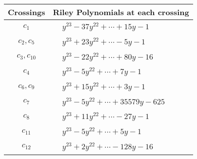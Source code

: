\documentclass[1p]{elsarticle_modified}
\theoremstyle{definition}
\begin{document}
\begin{tabular}{m{50pt}|m{274pt}}
Crossings & \hspace{64pt}Riley Polynomials at each crossing \\
\hline $$\begin{aligned}c_{1}\end{aligned}$$&$\begin{aligned}
&y^{23}-37 y^{22}+\cdots+15 y-1
\end{aligned}$\\
\hline $$\begin{aligned}c_{2},c_{5}\end{aligned}$$&$\begin{aligned}
&y^{23}+23 y^{22}+\cdots-5 y-1
\end{aligned}$\\
\hline $$\begin{aligned}c_{3},c_{10}\end{aligned}$$&$\begin{aligned}
&y^{23}-22 y^{22}+\cdots+80 y-16
\end{aligned}$\\
\hline $$\begin{aligned}c_{4}\end{aligned}$$&$\begin{aligned}
&y^{23}-5 y^{22}+\cdots+7 y-1
\end{aligned}$\\
\hline $$\begin{aligned}c_{6},c_{9}\end{aligned}$$&$\begin{aligned}
&y^{23}+15 y^{22}+\cdots+3 y-1
\end{aligned}$\\
\hline $$\begin{aligned}c_{7}\end{aligned}$$&$\begin{aligned}
&y^{23}-5 y^{22}+\cdots+35579 y-625
\end{aligned}$\\
\hline $$\begin{aligned}c_{8}\end{aligned}$$&$\begin{aligned}
&y^{23}+11 y^{22}+\cdots-27 y-1
\end{aligned}$\\
\hline $$\begin{aligned}c_{11}\end{aligned}$$&$\begin{aligned}
&y^{23}-5 y^{22}+\cdots+5 y-1
\end{aligned}$\\
\hline $$\begin{aligned}c_{12}\end{aligned}$$&$\begin{aligned}
&y^{23}+2 y^{22}+\cdots-128 y-16
\end{aligned}$\\
\hline
\end{tabular}\\~\\
\end{document}
